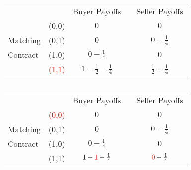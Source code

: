 \documentclass[12pt,letterpaper]{article}           %
\begin{document}
$ $

\newpage


\begin{table}[]
	\begin{tabular}{lcccc}
		&                            & Buyer Payoffs         &                       & Seller Payoffs        \\ \cline{3-3} \cline{5-5} 
		& \multicolumn{1}{c|}{(0,0)} & \multicolumn{1}{c|}{$ 0$} & \multicolumn{1}{c|}{} & \multicolumn{1}{c|}{$ 0$} \\ \cline{3-3} \cline{5-5} 
		Matching & \multicolumn{1}{c|}{(0,1)} & \multicolumn{1}{c|}{$0$} & \multicolumn{1}{c|}{} & \multicolumn{1}{c|}{$0 -\frac{1}{4}$}  \\ \cline{3-3} \cline{5-5} 
		Contract& \multicolumn{1}{c|}{(1,0)} & \multicolumn{1}{c|}{$ 0 - \frac{1}{4}$} & \multicolumn{1}{c|}{} & \multicolumn{1}{c|}{$ 0$} \\ \cline{3-3} \cline{5-5} 
		& \multicolumn{1}{c|}{\textcolor{red}{(1,1)}} & \multicolumn{1}{c|}{$ 1 - \frac{1}{2}- \frac{1}{4}$} & \multicolumn{1}{c|}{} & \multicolumn{1}{c|}{$  \frac{1}{2}- \frac{1}{4}$} \\ \cline{3-3} \cline{5-5} 
	\end{tabular}
\end{table}


$ $

\newpage


\begin{table}[]
	\begin{tabular}{lcccc}
		&                            & Buyer Payoffs         &                       & Seller Payoffs        \\ \cline{3-3} \cline{5-5} 
		& \multicolumn{1}{c|}{\textcolor{red}{(0,0)}} & \multicolumn{1}{c|}{$ 0$} & \multicolumn{1}{c|}{} & \multicolumn{1}{c|}{$ 0$} \\ \cline{3-3} \cline{5-5} 
		Matching & \multicolumn{1}{c|}{(0,1)} & \multicolumn{1}{c|}{$0$} & \multicolumn{1}{c|}{} & \multicolumn{1}{c|}{$0 -\frac{1}{4}$}  \\ \cline{3-3} \cline{5-5} 
		Contract& \multicolumn{1}{c|}{(1,0)} & \multicolumn{1}{c|}{$ 0 - \frac{1}{4}$} & \multicolumn{1}{c|}{} & \multicolumn{1}{c|}{$ 0$} \\ \cline{3-3} \cline{5-5} 
		& \multicolumn{1}{c|}{(1,1)} & \multicolumn{1}{c|}{$ 1 - \textcolor{red}{1} - \frac{1}{4}$} & \multicolumn{1}{c|}{} & \multicolumn{1}{c|}{$ \textcolor{red}{0} - \frac{1}{4}$} \\ \cline{3-3} \cline{5-5} 
	\end{tabular}
\end{table}
\end{document}

